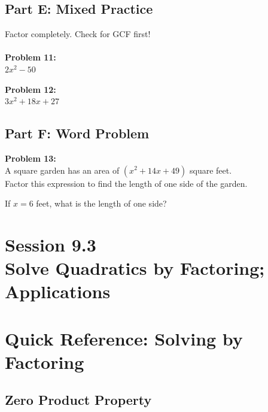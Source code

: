 \documentclass[12pt]{article}
\begin{document}
			\newpage

		\subsection*{Part E: Mixed Practice}

			Factor completely. Check for GCF first!\\\\

			\textbf{Problem 11:}\\
            
            $2x^2 - 50$

			\vspace{4cm}

			\textbf{Problem 12:}\\
            
            $3x^2 + 18x + 27$

			\newpage

		\subsection*{Part F: Word Problem}

			\textbf{Problem 13:}\\
			
			A square garden has an area of $(x^2 + 14x + 49)$ square feet.\\

			Factor this expression to find the length of one side of the garden.

			\vspace{4cm}

			If $x = 6$ feet, what is the length of one side?

			\newpage

	\section*{Session 9.3 \\ Solve Quadratics by Factoring; Applications}

	\section*{Quick Reference: Solving by Factoring}

		\subsection*{Zero Product Property}
\end{document}
